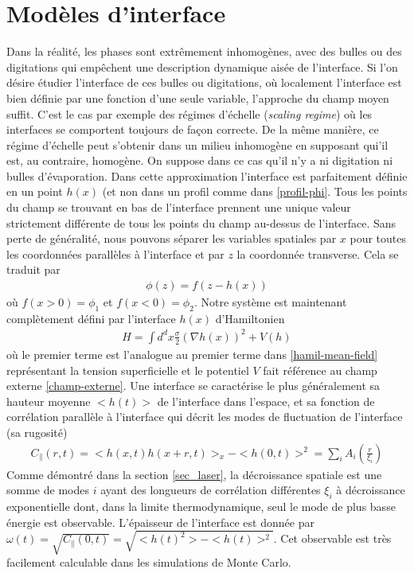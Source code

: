     \section{Modèles d'interface}

Dans la réalité, les phases sont extrêmement inhomogènes, avec des bulles ou des digitations qui empêchent une description dynamique aisée de l'interface. Si l'on désire étudier l'interface de ces bulles ou digitations, où localement l'interface est bien définie par une fonction d'une seule variable, l'approche du champ moyen suffit. C'est le cas par exemple des régimes d'échelle (\textit{scaling regime}) où les interfaces se comportent toujours de façon correcte. De la même manière, ce régime d'échelle peut s'obtenir dans un milieu inhomogène en supposant qui'il est, au contraire, homogène. On suppose dans ce cas qu'il n'y a ni digitation ni bulles d'évaporation. Dans cette approximation l'interface est parfaitement définie en un point $h(x)$ (et non dans un profil comme dans \ref{profil-phi}. Tous les points du champ se trouvant en bas de l'interface prennent une unique valeur strictement différente de tous les points du champ au-dessus de l'interface. Sans perte de généralité, nous pouvons séparer les variables spatiales par $x$ pour toutes les coordonnées parallèles à l'interface et par $z$ la coordonnée transverse. Cela se traduit par
\begin{align}
    \phi(z) = f(z-h(x))
    \label{capillary-wave-theory}
\end{align}
où $f(x\greater 0) = \phi_1$ et $f(x\less 0) = \phi_2$. Notre système est maintenant complètement défini par l'interface $h(x)$ d'Hamiltonien
\begin{align}
    H = \int d^d x \frac{\sigma}{2} (\nabla h(x))^2 + V(h)
    \label{hamil-cwt}
\end{align}
où le premier terme est l'analogue au premier terme dans \ref{hamil-mean-field} représentant la tension superficielle et le potentiel $V$ fait référence au champ externe \ref{champ-externe}. 
Une interface se caractérise le plus généralement sa hauteur moyenne $<h(t)>$ de l'interface dans l'espace, et sa fonction de corrélation parallèle à l'interface qui décrit les modes de fluctuation de l'interface (sa rugosité)
\begin{align}
    C_\parallel(r,t) = <h(x,t)h(x+r,t)>_x - <h(0,t)>^2 = \sum_i A_i(\frac{r}{\xi_i}) 
\end{align}
Comme démontré dans la section \ref{sec_laser}, la décroissance spatiale est une somme de modes $i$ ayant des longueurs de corrélation différentes $\xi_i$ à décroissance exponentielle dont, dans la limite thermodynamique, seul le mode de plus basse énergie est observable. 
L'épaisseur de l'interface est donnée par $\omega(t) = \sqrt{C_\parallel(0,t)} = \sqrt{<h(t)^2> - <h(t)>^2}$. Cet observable est très facilement calculable dans les simulations de Monte Carlo.



